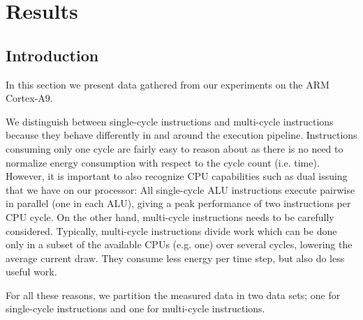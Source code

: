 \section{Results}

%
%
%
%

\subsection{Introduction}
In this section we present data gathered from our experiments on the ARM
Cortex-A9.

We distinguish between single-cycle instructions and multi-cycle instructions
because they behave differently in and around the execution pipeline.
Instructions consuming only one cycle are fairly easy to reason about as there
is no need to normalize energy consumption with respect to the cycle count (i.e.
time). However, it is important to also recognize CPU capabilities such as dual
issuing that we have on our processor: All single-cycle ALU instructions execute
pairwise in parallel (one in each ALU), giving a peak performance of two
instructions per CPU cycle. On the other hand, multi-cycle instructions needs to
be carefully considered. Typically, multi-cycle instructions divide work which
can be done only in a subset of the available CPUs (e.g. one) over several
cycles, lowering the average current draw. They consume less energy per
time step, but also do less useful work.

For all these reasons, we partition the measured data in two data sets; one for
single-cycle instructions and one for multi-cycle instructions.

